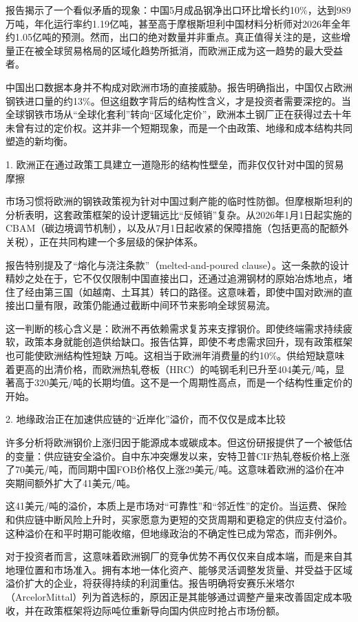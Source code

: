 \documentclass[11pt]{ctexart}
\begin{document}
报告揭示了一个看似矛盾的现象：中国5月成品钢净出口环比增长约10\%，达到989万吨，年化运行率约1.19亿吨，甚至高于摩根斯坦利中国材料分析师对2026年全年约1.05亿吨的预测。然而，出口的绝对数量并非重点。真正值得关注的是，这些增量正在被全球贸易格局的区域化趋势所抵消，而欧洲正成为这一趋势的最大受益者。

中国出口数据本身并不构成对欧洲市场的直接威胁。报告明确指出，中国仅占欧洲钢铁进口量的约13\%。但这组数字背后的结构性含义，才是投资者需要深挖的。当全球钢铁市场从“全球化套利”转向“区域化定价”，欧洲本土钢厂正在获得过去十年未曾有过的定价权。这并非一个短期现象，而是一个由政策、地缘和成本结构共同塑造的新均衡。

1. 欧洲正在通过政策工具建立一道隐形的结构性壁垒，而非仅仅针对中国的贸易摩擦

市场习惯将欧洲的钢铁政策视为针对中国过剩产能的临时性防御。但摩根斯坦利的分析表明，这套政策框架的设计逻辑远比“反倾销”复杂。从2026年1月1日起实施的CBAM（碳边境调节机制），以及从7月1日起收紧的保障措施（包括更高的配额外关税），正在共同构建一个多层级的保护体系。

报告特别提及了“熔化与浇注条款”（melted-and-poured clause）。这一条款的设计精妙之处在于，它不仅仅限制中国直接出口，还通过追溯钢材的原始冶炼地点，堵住了经由第三国（如越南、土耳其）转口的路径。这意味着，即使中国对欧洲的直接出口量有限，政策仍能通过截断中间环节来影响全球贸易流。

这一判断的核心含义是：欧洲不再依赖需求复苏来支撑钢价。即使终端需求持续疲软，政策本身就能创造供给缺口。报告估算，即使不考虑需求回升，现有政策框架也可能使欧洲结构性短缺 万吨。这相当于欧洲年消费量的约10\%。供给短缺意味着更高的出清价格，而欧洲热轧卷板（HRC）的吨钢毛利已升至404美元/吨，显著高于320美元/吨的长期均值。这不是一个周期性高点，而是一个结构性重定价的开始。

2. 地缘政治正在加速供应链的“近岸化”溢价，而不仅仅是成本比较

许多分析将欧洲钢价上涨归因于能源成本或碳成本。但这份研报提供了一个被低估的变量：供应链安全溢价。自中东冲突爆发以来，安特卫普CIF热轧卷板价格上涨了70美元/吨，而同期中国FOB价格仅上涨29美元/吨。这意味着欧洲的溢价在冲突期间额外扩大了41美元/吨。

这41美元/吨的溢价，本质上是市场对“可靠性”和“邻近性”的定价。当运费、保险和供应链中断风险上升时，买家愿意为更短的交货周期和更稳定的供应支付溢价。这种溢价在和平时期可能收缩，但地缘政治的不确定性已成为常态，而非例外。

对于投资者而言，这意味着欧洲钢厂的竞争优势不再仅仅来自成本端，而是来自其地理位置和市场准入。拥有本地一体化资产、能够灵活调整发货量、并受益于区域溢价扩大的企业，将获得持续的利润重估。报告明确将安赛乐米塔尔（ArcelorMittal）列为首选标的，原因正是其能够通过调整产量来改善固定成本吸收，并在政策框架将边际吨位重新导向国内供应时抢占市场份额。
\end{document}
